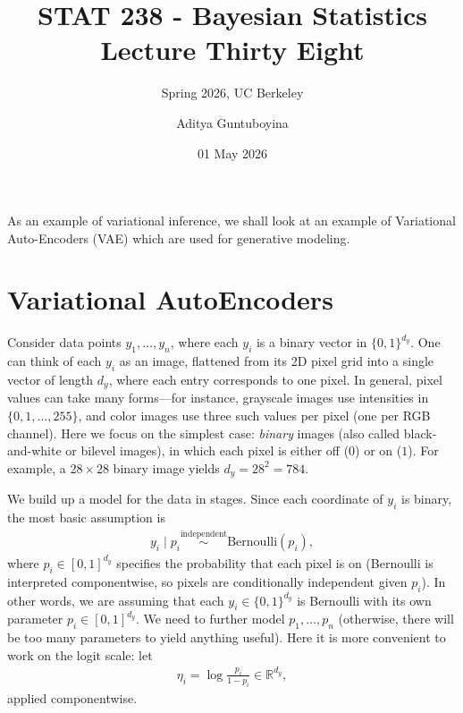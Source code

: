 \documentclass{scrartcl}
\begin{document}
\title{STAT 238 - Bayesian Statistics  \\
  Lecture Thirty Eight} 
\subtitle{Spring 2026, UC Berkeley}

\author{Aditya Guntuboyina}


\date{01 May 2026}

\maketitle

As an example of variational inference, we shall look at an example of
Variational Auto-Encoders (VAE) which are used for generative modeling.

\section{Variational AutoEncoders}

Consider data points $y_1, \dots, y_n$, where each $y_i$ is a binary
vector in $\{0, 1\}^{d_y}$. One can think of each $y_i$ as an image,
flattened from its 2D pixel grid into a single vector of length $d_y$,
where each entry corresponds to one pixel. In general, pixel values
can take many forms---for instance, grayscale images use intensities
in $\{0, 1, \dots, 255\}$, and color images use three such values per
pixel (one per RGB channel). Here we focus on the simplest case:
\emph{binary} images (also called black-and-white or bilevel images),
in which each pixel is either off ($0$) or on ($1$). For example, a
$28 \times 28$ binary image yields $d_y = 28^2 = 784$.

We build up a model for the data in stages. Since each coordinate of
$y_i$ is binary, the most basic assumption is
\begin{align*}
  y_i \mid p_i \overset{\text{independent}}{\sim} \mathrm{Bernoulli}(p_i),
\end{align*}
where $p_i \in [0, 1]^{d_y}$ specifies the probability that each pixel
is on (Bernoulli is interpreted componentwise, so pixels are
conditionally independent given $p_i$). In other words, we are
assuming that each $y_i \in \{0, 1\}^{d_y}$ is Bernoulli with its own
parameter $p_i \in [0, 1]^{d_y}$. We need to further model $p_1,
\dots, p_n$ (otherwise, there will be too many parameters to yield
anything useful). Here it is more convenient to work
on the logit scale: let 
\begin{align*}
  \eta_i = \log\!\frac{p_i}{1 - p_i} \in \mathbb{R}^{d_y},
\end{align*}
applied componentwise.
\end{document}
